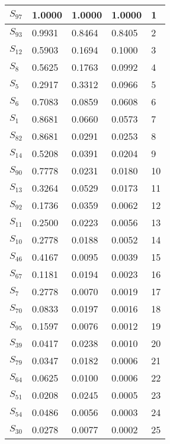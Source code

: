 \begin{xltabular}{\textwidth}{|X|X|X|X|X|}
        \hline
        \endlastfoot
    $S_{97}$ & 1.0000 & 1.0000 & 1.0000 & 1 \\ \hline
 $S_{93}$ & 0.9931 & 0.8464 & 0.8405 & 2 \\ \hline
 $S_{12}$ & 0.5903 & 0.1694 & 0.1000 & 3 \\ \hline
 $S_{8}$ & 0.5625 & 0.1763 & 0.0992 & 4 \\ \hline
 $S_{5}$ & 0.2917 & 0.3312 & 0.0966 & 5 \\ \hline
 $S_{6}$ & 0.7083 & 0.0859 & 0.0608 & 6 \\ \hline
 $S_{1}$ & 0.8681 & 0.0660 & 0.0573 & 7 \\ \hline
 $S_{82}$ & 0.8681 & 0.0291 & 0.0253 & 8 \\ \hline
 $S_{14}$ & 0.5208 & 0.0391 & 0.0204 & 9 \\ \hline
 $S_{90}$ & 0.7778 & 0.0231 & 0.0180 & 10 \\ \hline
 $S_{13}$ & 0.3264 & 0.0529 & 0.0173 & 11 \\ \hline
 $S_{92}$ & 0.1736 & 0.0359 & 0.0062 & 12 \\ \hline
 $S_{11}$ & 0.2500 & 0.0223 & 0.0056 & 13 \\ \hline
 $S_{10}$ & 0.2778 & 0.0188 & 0.0052 & 14 \\ \hline
 $S_{46}$ & 0.4167 & 0.0095 & 0.0039 & 15 \\ \hline
 $S_{67}$ & 0.1181 & 0.0194 & 0.0023 & 16 \\ \hline
 $S_{7}$ & 0.2778 & 0.0070 & 0.0019 & 17 \\ \hline
 $S_{70}$ & 0.0833 & 0.0197 & 0.0016 & 18 \\ \hline
 $S_{95}$ & 0.1597 & 0.0076 & 0.0012 & 19 \\ \hline
 $S_{39}$ & 0.0417 & 0.0238 & 0.0010 & 20 \\ \hline
 $S_{79}$ & 0.0347 & 0.0182 & 0.0006 & 21 \\ \hline
 $S_{64}$ & 0.0625 & 0.0100 & 0.0006 & 22 \\ \hline
 $S_{51}$ & 0.0208 & 0.0245 & 0.0005 & 23 \\ \hline
 $S_{54}$ & 0.0486 & 0.0056 & 0.0003 & 24 \\ \hline
 $S_{30}$ & 0.0278 & 0.0077 & 0.0002 & 25 \\ \hline
    \end{xltabular}
    